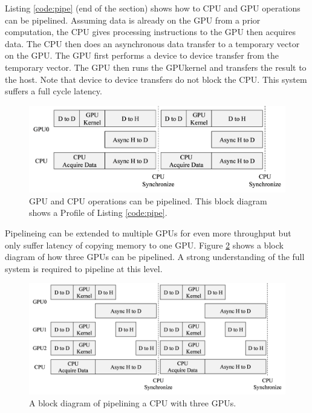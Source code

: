 Listing \ref{code:pipe} (end of the section) shows how to CPU and GPU operations can be pipelined.
Assuming data is already on the GPU from a prior computation, the CPU gives processing instructions to the GPU then acquires data.
The CPU then does an asynchronous data transfer to a temporary vector on the GPU.
The GPU first performs a device to device transfer from the temporary vector.
The GPU then runs the GPUkernel and transfers the result to the host.
Note that device to device transfers do not block the CPU.
This system suffers a full cycle latency.
\begin{figure}
	\centering\includegraphics[width=9.97in/100*55]{figures/gpu_intro/concurrentCPU_nonBlocking.pdf}
	\caption{GPU and CPU operations can be pipelined. This block diagram shows a Profile of Listing \ref{code:pipe}.}
	\label{fig:concurrentCPU_nonBlocking}
\end{figure}

Pipelineing can be extended to multiple GPUs for even more throughput but only suffer latency of copying memory to one GPU.
Figure \ref{fig:concurrentCPU_nonBlocking_multiGPU} shows a block diagram of how three GPUs can be pipelined.
A strong understanding of the full system is required to pipeline at this level.
\begin{figure}
	\centering\includegraphics[width=11.4in/100*55]{figures/gpu_intro/concurrentCPU_nonBlocking_multiGPU.pdf}
	\caption{A block diagram of pipelining a CPU with three GPUs.}
	\label{fig:concurrentCPU_nonBlocking_multiGPU}
\end{figure}

